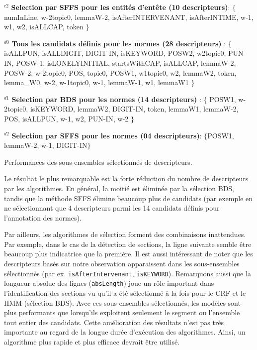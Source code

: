 \begin{table}[!htb]
$^{c2}$ \textbf{Selection par SFFS pour les  entités d'entête (10 descripteurs)}: $\lbrace$ numInLine, w-2topic0, lemmaW-2, isAfterINTERVENANT, isAfterINTIME, w-1, w1, w2, isALLCAP, token $\rbrace$ 

$^{d0}$ \textbf{Tous les candidats définis pour les normes (28 descripteurs)} : $\lbrace$ isALLPUN, isALLDIGIT, DIGIT-IN, isKEYWORD, POSW2, w2topic0, PUN-IN, POSW-1, isLONELYINITIAL, startsWithCAP, isALLCAP, lemmaW-2, POSW-2, w-2topic0, POS, topic0, POSW1, w1topic0, w2, lemmaW2, token, lemma\_W0, w-2, w-1topic0, w-1, lemmaW-1, w1, lemmaW1 $\rbrace$ 

$^{d1}$ \textbf{Selection par BDS pour les normes (14 descripteurs)} : $\lbrace$ POSW1, w-2topic0, isKEYWORD, lemmaW2, DIGIT-IN, token, lemmaW1, lemmaW-2, POS, isALLPUN, w-1, w2, PUN-IN, w-2 $\rbrace$ 

$^{d2}$ \textbf{Selection par SFFS pour les normes (04 descripteurs)}: $\lbrace$POSW1, lemmaW-2, w-1, DIGIT-IN$\rbrace$ 

\caption{Performances des sous-ensembles sélectionnés de descripteurs.}\label{fig:structuration:select-feats}
\end{table}

Le résultat le plus remarquable est la forte réduction du nombre de descripteurs par les algorithmes. En général, la moitié est éliminée par la sélection BDS, tandis que la méthode SFFS élimine beaucoup plus de candidats (par exemple en ne sélectionnant que 4 descripteurs parmi les 14 candidats définis pour l'annotation des normes).

Par ailleurs, les algorithmes de sélection forment des combinaisons inattendues. Par exemple, dans le cas de la détection de sections, la ligne suivante semble être beaucoup plus indicatrice que la première. Il est aussi intéressant de noter que les descripteurs basés sur notre observation apparaissent dans les sous-ensembles sélectionnés (par ex. \verb|isAfterIntervenant|, \verb|isKEYWORD|). Remarquons aussi que la longueur absolue des lignes (\verb|absLength|)  joue un rôle important dans l'identification des sections vu qu'il a été sélectionné à la fois pour le CRF et le HMM (sélection BDS). Avec ces sous-ensembles sélectionnés, les modèles sont plus performants que lorsqu'ils exploitent seulement le segment ou l'ensemble tout entier des candidats.  Cette amélioration des résultats n'est pas très importante au regard de la longue durée d'exécution des algorithmes. Ainsi, un algorithme plus rapide et plus efficace devrait être utilisé.


